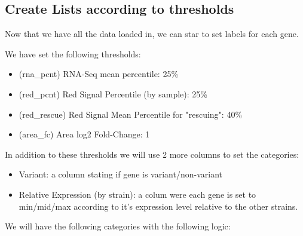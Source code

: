 \documentclass[11pt]{article}
\begin{document}
\subsection{Create Lists according to thresholds}
\label{sec:org4ed0248}

Now that we have all the data loaded in, we can star to set labels for each gene.

We have set the following thresholds:
\begin{itemize}
\item (rna\_pcnt) RNA-Seq mean percentile: 25\%
\item (red\_pcnt) Red Signal Percentile (by sample): 25\%
\item (red\_rescue) Red Signal Mean Percentile for "rescuing": 40\%
\item (area\_fc) Area log2 Fold-Change: 1
\end{itemize}

In addition to these thresholds we will use 2 more columns to set the categories:
\begin{itemize}
\item Variant: a column stating if gene is variant/non-variant
\item Relative Expression (by strain): a colum were each gene is set to min/mid/max according to it's expression level relative to the other strains.
\end{itemize}

We will have the following categories with the following logic:
\end{document}
